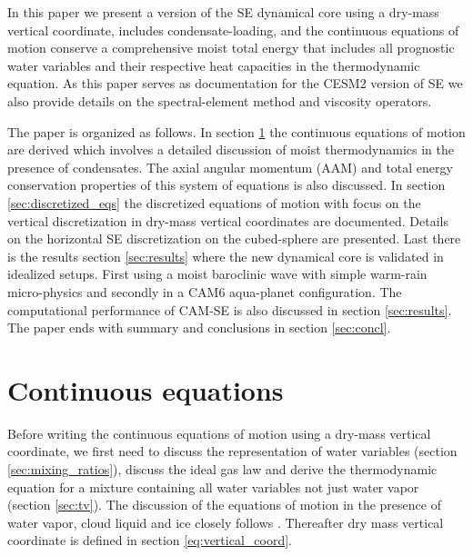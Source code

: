 \documentclass{agujournal}
\begin{document}
In this paper we present a version of the SE dynamical core using a dry-mass vertical coordinate, includes condensate-loading, and the continuous equations of motion conserve a comprehensive moist total energy that includes all prognostic water variables and their respective heat capacities in the thermodynamic equation. As this paper serves as documentation for the CESM2 version of SE we also provide details on the spectral-element method and viscosity operators. 

The paper is organized as follows. In section \ref{sec:cont-eq} the continuous equations of motion are derived which involves a detailed discussion of moist thermodynamics in the presence of condensates. The axial angular momentum (AAM) and total energy conservation properties of this system of equations is also discussed. In section \ref{sec:discretized_eqs} the discretized equations of motion with focus on the vertical discretization in dry-mass vertical coordinates are documented. Details on the horizontal SE discretization on the cubed-sphere are presented. Last there is the results section \ref{sec:results} where the new dynamical core is validated in idealized setups. First using a moist baroclinic wave with simple warm-rain micro-physics and secondly in a CAM6 aqua-planet configuration. The computational performance of CAM-SE is also discussed in section \ref{sec:results}. The paper ends with summary and conclusions in section \ref{sec:concl}.
%
\section{Continuous equations}\label{sec:cont-eq}
Before writing the continuous equations of motion using a dry-mass vertical coordinate, we first need to discuss the representation of water variables (section \ref{sec:mixing_ratios}), discuss the ideal gas law and derive the thermodynamic equation for a mixture containing all water variables not just water vapor (section \ref{sec:tv}). The discussion of the equations of motion in the presence of water vapor, cloud liquid and ice closely follows \citet{joyOfUM}. Thereafter dry mass vertical coordinate is defined in section \ref{eq:vertical_coord}. {\color{red}{more details on other sections}}
\end{document}
